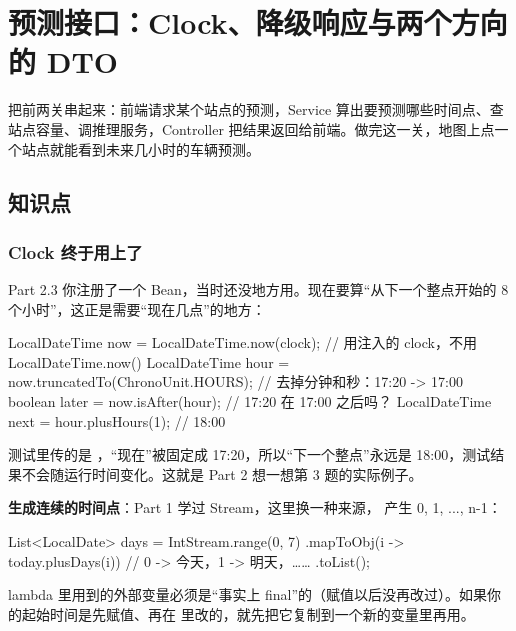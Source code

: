 \chapter{预测接口：Clock、降级响应与两个方向的 DTO}

把前两关串起来：前端请求某个站点的预测，Service 算出要预测哪些时间点、查站点容量、调推理服务，Controller 把结果返回给前端。做完这一关，地图上点一个站点就能看到未来几小时的车辆预测。


\section{知识点}

\subsection{Clock 终于用上了}

Part 2.3 你注册了一个  Bean，当时还没地方用。现在要算“从下一个整点开始的 8 个小时”，这正是需要“现在几点”的地方：

\begin{java}
LocalDateTime now = LocalDateTime.now(clock);                  // 用注入的 clock，不用 LocalDateTime.now()
LocalDateTime hour = now.truncatedTo(ChronoUnit.HOURS);        // 去掉分钟和秒：17:20 -> 17:00
boolean later = now.isAfter(hour);                             // 17:20 在 17:00 之后吗？
LocalDateTime next = hour.plusHours(1);                        // 18:00
\end{java}

测试里传的是 ，“现在”被固定成 17:20，所以“下一个整点”永远是 18:00，测试结果不会随运行时间变化。这就是 Part 2 想一想第 3 题的实际例子。

\textbf{生成连续的时间点}：Part 1 学过 Stream，这里换一种来源， 产生 0, 1, ..., n-1：

\begin{java}
List<LocalDate> days = IntStream.range(0, 7)
        .mapToObj(i -> today.plusDays(i))      // 0 -> 今天，1 -> 明天，……
        .toList();
\end{java}

lambda 里用到的外部变量必须是“事实上 final”的（赋值以后没再改过）。如果你的起始时间是先赋值、再在  里改的，就先把它复制到一个新的变量里再用。

